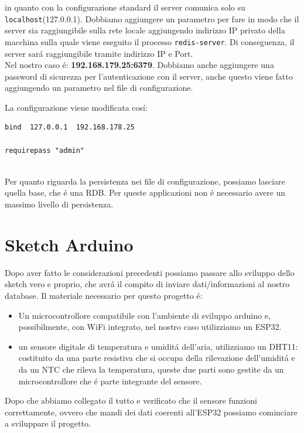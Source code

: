 in quanto con la configurazione standard il server comunica solo su \texttt{localhost}(127.0.0.1).
Dobbiamo aggiungere un parametro per fare in modo che il server sia raggiungibile sulla rete locale aggiungendo indirizzo IP
privato della macchina sulla quale viene eseguito il processo \texttt{redis-server}.
Di conseguenza, il server sará raggiungibile tramite indirizzo IP e Port.\\
Nel nostro caso é: \textbf{192.168.179.25:6379}.
Dobbiamo anche aggiungere una password di sicurezza per l'autenticazione con il server, anche questo viene fatto
aggiungendo un parametro nel file di configurazione.

La configurazione viene modificata cosí:
\begin{lstlisting}[autogobble]
bind  127.0.0.1  192.168.178.25

requirepass "admin"\end{lstlisting}

\\

Per quanto riguarda la persistenza nei file di configurazione, possiamo lasciare quella base, che é una RDB.
Per queste applicazioni non é necessario avere un massimo livello di persistenza.

\section{Sketch Arduino}
Dopo aver fatto le considerazioni precedenti possiamo passare allo sviluppo dello sketch vero e proprio, che avrá il compito
di inviare dati/informazioni al nostro database.
Il materiale necessario per questo progetto é:
\begin{itemize}
    \item Un microcontrollore compatibile con l'ambiente di sviluppo arduino e, possibilmente, con WiFi integrato,
          nel nostro caso utilizziamo un ESP32.
    \item un sensore digitale di temperatura e umiditá dell'aria, utilizziamo un DHT11: costituito da una parte resistiva
    che si occupa della rilevazione dell'umiditá e da un NTC che rileva la temperatura, queste due parti sono gestite
    da un microcontrollore che é parte integrante del sensore.
\end{itemize}

Dopo che abbiamo collegato il tutto e verificato che il sensore funzioni correttamente, ovvero che mandi dei dati
coerenti all'ESP32 possiamo cominciare a sviluppare il progetto.

